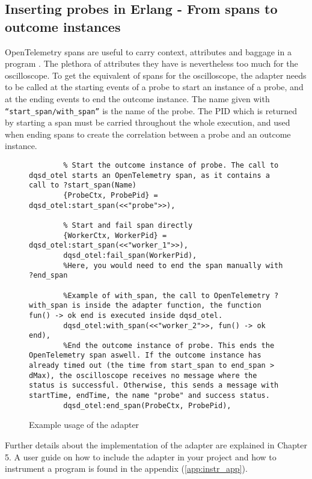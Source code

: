     \subsection{Inserting probes in Erlang - From spans to outcome instances}
        OpenTelemetry spans are useful to carry context, attributes and baggage in a program \cite{otel-dt}. The plethora of attributes they have is nevertheless too much for the oscilloscope. 
        To get the equivalent of spans for the oscilloscope, the adapter needs to be called at the starting events of a probe to start an instance of a probe, and at the ending events to end the outcome instance. The name given with \texttt{``start\_span/with\_span''} is the name of the probe. The PID which is returned by starting a span must be carried throughout the whole execution, and used when ending spans to create the correlation between a probe and an outcome instance.
\begin{figure}[H]
\centering
   \begin{verbatim}
        % Start the outcome instance of probe. The call to dqsd_otel starts an OpenTelemetry span, as it contains a call to ?start_span(Name)
        {ProbeCtx, ProbePid} = dqsd_otel:start_span(<<"probe">>),  

        % Start and fail span directly
        {WorkerCtx, WorkerPid} = dqsd_otel:start_span(<<"worker_1">>),   
        dqsd_otel:fail_span(WorkerPid),
        %Here, you would need to end the span manually with ?end_span

        %Example of with_span, the call to OpenTelemetry ?with_span is inside the adapter function, the function fun() -> ok end is executed inside dqsd_otel.
        dqsd_otel:with_span(<<"worker_2">>, fun() -> ok end), 
        %End the outcome instance of probe. This ends the OpenTelemetry span aswell. If the outcome instance has already timed out (the time from start_span to end_span > dMax), the oscilloscope receives no message where the status is successful. Otherwise, this sends a message with startTime, endTime, the name "probe" and success status.
        dqsd_otel:end_span(ProbeCtx, ProbePid),
        \end{verbatim}
\caption{Example usage of the adapter}\label{code:adapter}
\end{figure}
    Further details about the implementation of the adapter are explained in Chapter 5. A user guide on how to include the adapter in your project and how to instrument a program is found in the appendix (\cref{app:instr_app}). 
